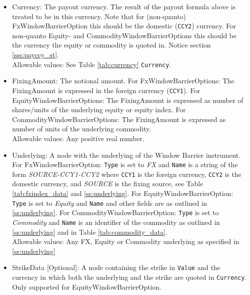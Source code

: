 \begin{itemize}

\item Currency: The payout currency. The result of the payout formula above is treated to be in this currency. Note that
  for (non-quanto) FxWindowBarrierOption this should be the domestic (\lstinline!CCY2!) currency. For non-quanto Equity-
  and CommodityWindowBarrierOptions this should be the currency the equity or commodity is quoted in. Notice section
  \ref{sss:payccy_st}. \\

Allowable values: See Table \ref{tab:currency} \lstinline!Currency!.

\item FixingAmount: The notional amount. For FxWindowBarrierOptions: The FixingAmount is expressed in the foreign currency
  (\lstinline!CCY1!).  For EquityWindowBarrierOptions: The FixingAmount is expressed as number of shares/units of the underlying
  equity or equity index. For CommodityWindowBarrierOptions: The FixingAmount is expressed as number of units of the underlying
  commodity. \\

Allowable values: Any positive real number.

\item Underlying: A node with the underlying of the Window Barrier instrument. For FxWindowBarrierOption:
  \lstinline!Type! is set to \emph{FX} and \lstinline!Name! is a string of the form \emph{SOURCE-CCY1-CCY2} where
  \lstinline!CCY1! is the foreign currency, \lstinline!CCY2! is the domestic currency, and \emph{SOURCE} is the fixing
  source, see Table \ref{tab:fxindex_data} and \ref{ss:underlying}. For EquityWindowBarrierOption: \lstinline!Type! is
  set to \emph{Equity} and \lstinline!Name! and other fields are as outlined in \ref{ss:underlying}. For
  CommodityWindowBarrierOption: \lstinline!Type! is set to \emph{Commodity} and \lstinline!Name! is an identifier of the
  commodity as outlined in \ref{ss:underlying} and in Table \ref{tab:commodity_data}.\\

Allowable values: Any FX, Equity or Commodity underlying as specified in \ref{ss:underlying}

\item StrikeData [Optional]: A node containing the strike in \lstinline!Value! and the currency in which both the
  underlying and the strike are quoted in \lstinline!Currency!. Only supported for EquityWindowBarrierOption.\\


\end{itemize}
